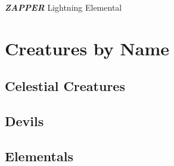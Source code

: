 \textbf{\textit{ZAPPER}} Lightning Elemental \\

\newpage

\section{Creatures by Name} 

\subsection{Celestial Creatures}


















\subsection{Devils}

\subsection{Elementals}








